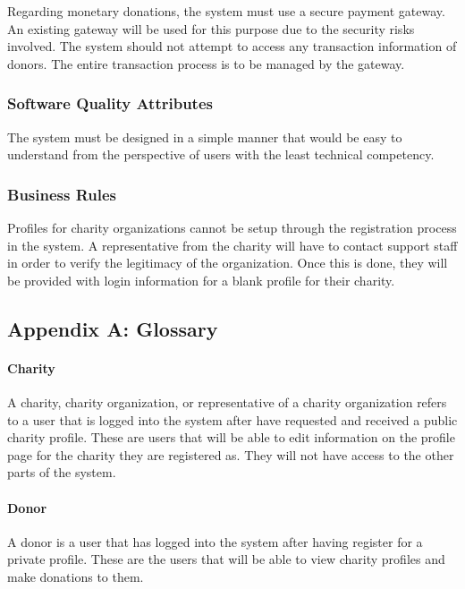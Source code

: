 \documentclass{scrreprt}
\begin{document}
            Regarding monetary donations, the system must use a secure payment gateway. An existing gateway will be used for this purpose due to the security risks involved. The system should not attempt to access any transaction information of donors. The entire transaction process is to be managed by the gateway.

        \subsubsection{Software Quality Attributes}

            The system must be designed in a simple manner that would be easy to understand from the perspective of users with the least technical competency.

        \subsubsection{Business Rules}

            Profiles for charity organizations cannot be setup through the registration process in the system. A representative from the charity will have to contact support staff in order to verify the legitimacy of the organization. Once this is done, they will be provided with login information for a blank profile for their charity.

        \subsection{Appendix A: Glossary}
        
            \paragraph{Charity}\mbox{}\par
                A charity, charity organization, or representative of a charity organization refers to a user that is logged into the system after have requested and received a public charity profile. These are users that will be able to edit information on the profile page for the charity they are registered as. They will not have access to the other parts of the system.
            
            \paragraph{Donor}
                A donor is a user that has logged into the system after having register for a private profile. These are the users that will be able to view charity profiles and make donations to them.
        
\end{document}
